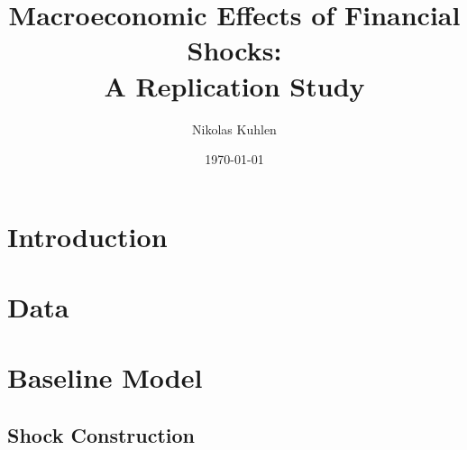 \documentclass[12pt,a4paper,leqno]{article}
\begin{document}
\title{Macroeconomic Effects of Financial Shocks: \\A Replication Study
}

\author{Nikolas Kuhlen
}

\date{\today}

\maketitle
\thispagestyle{empty}


\clearpage

\newpage
\setcounter{page}{2}
\newpage
\tableofcontents%
\newpage
\listoffigures
\listoftables


\newpage
{}%
\setcounter{page}{1}

\section{Introduction}
\label{sec:introduction}


\section{Data}
\label{sec:data}


\section{Baseline Model}
\label{sec:baseline_model}


\subsection{Shock Construction}
\label{sec:shock_construction}

\end{document}
